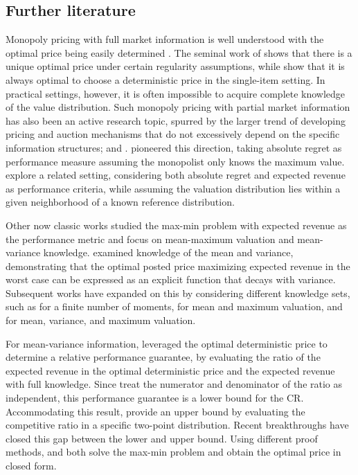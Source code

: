 \documentclass[11pt]{article}
\newcommand{\1}{\mathds{1}}
\begin{document}
\subsection{Further literature}
Monopoly pricing with full market information is well understood with the optimal price being easily determined \citep{riley1983optimal, myerson1981optimal}. The seminal work of \cite{myerson1981optimal} shows that there is a unique optimal price under certain regularity assumptions, while \cite{riley1983optimal} show that it is always optimal to choose a deterministic price in the single-item setting.
In practical settings, however, it is often impossible to acquire complete knowledge of the value distribution.
Such monopoly pricing with partial market information has also been an active research topic, spurred by the larger trend of developing pricing and auction mechanisms that do not excessively depend on the specific information structures;
\citep{wilson1985game} and \citep{carroll2019robustness}. \cite{bergemann2008pricing} pioneered this direction, taking absolute regret as performance measure assuming the monopolist only knows the maximum value. \citet{bergemann2011robust} explore a related setting, considering both absolute regret and expected revenue as performance criteria, while assuming the valuation distribution lies within a given neighborhood of a known reference distribution.

Other now classic works studied the max-min problem with expected revenue as the performance metric and focus on mean-maximum valuation and mean-variance knowledge. \cite{azar2012optimal} examined knowledge of the mean and variance, demonstrating that the optimal posted price maximizing expected revenue in the worst case can be expressed as an explicit function that decays with variance. Subsequent works have expanded on this by considering different knowledge sets, such as \cite{carrasco2018optimal} for a finite number of moments, \cite{kos2015selling} for mean and maximum valuation, and \cite{suzdaltsev2020distributionally} for mean, variance, and maximum valuation.
  
For mean-variance information, 
\cite{azar2012optimal} leveraged the optimal deterministic price to determine a relative performance guarantee, by evaluating the ratio of the expected revenue in the optimal deterministic price and the expected revenue with full knowledge. Since \cite{azar2012optimal} treat the numerator and denominator of the ratio as independent, this performance guarantee is a lower bound for the CR. Accommodating this result, \cite{azar2013parametric} provide an upper bound by evaluating the competitive ratio in a specific two-point distribution. 
Recent breakthroughs have closed this gap between the lower and upper bound.  Using different proof methods, \cite{giannakopoulos2019robust} and \cite{chen2022distribution} both solve the max-min problem and obtain the optimal price in closed form. 
\end{document}
